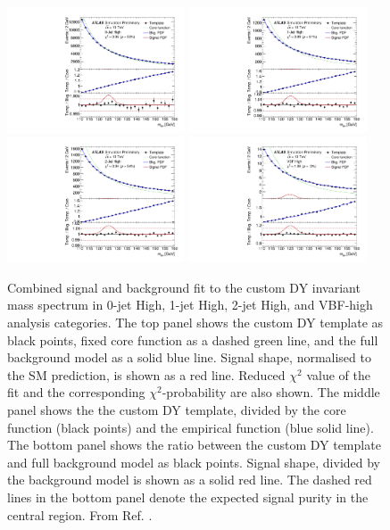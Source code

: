 \begin{figure}[h!]
  \centering
  \includegraphics[width=0.47\textwidth]{figures/hmumu/SS/BDT10}
  \includegraphics[width=0.47\textwidth]{figures/hmumu/SS/BDT7}
  \includegraphics[width=0.47\textwidth]{figures/hmumu/SS/BDT4}
  \includegraphics[width=0.47\textwidth]{figures/hmumu/SS/BDT1}
  \caption[Spurious signal fit to custom DY mass spectrum]{
  Combined signal and background fit to the custom DY invariant
  mass spectrum in 0-jet High, 1-jet High, 2-jet High, and VBF-high
  analysis categories. The top panel shows the custom DY template
  as black points, fixed core function as a dashed green line,
  and the full background model as a solid blue line. Signal shape,
  normalised to the SM prediction, is shown as a red line.
  Reduced $\chi^2$ value of the fit and the corresponding
  $\chi^2$-probability are also shown. The middle panel shows
  the the custom DY template, divided by the core function (black
  points) and the empirical function (blue solid line). The bottom
  panel shows the ratio between the custom DY template and
  full background model as black points. Signal shape, divided
  by the background model is shown as a solid red line. The dashed
  red lines in the bottom panel denote the expected signal purity
  in the central region. From Ref. \cite{ATLAS-CONF-2019-028}.
  }
  \label{fig:hmumu:ss}
\end{figure}

